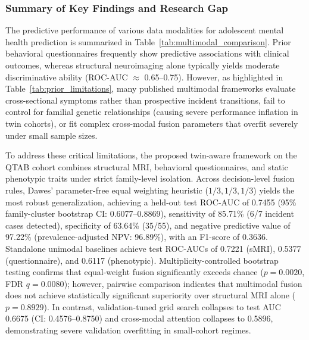\documentclass[10pt,letterpaper]{article}
\begin{document}
                \subsubsection*{Summary of Key Findings and Research Gap}

        The predictive performance of various data modalities for adolescent mental health prediction is summarized in Table~\ref{tab:multimodal_comparison}. Prior behavioral questionnaires frequently show predictive associations with clinical outcomes, whereas structural neuroimaging alone typically yields moderate discriminative ability (ROC-AUC $\approx$ 0.65--0.75). However, as highlighted in Table~\ref{tab:prior_limitations}, many published multimodal frameworks evaluate cross-sectional symptoms rather than prospective incident transitions, fail to control for familial genetic relationships (causing severe performance inflation in twin cohorts), or fit complex cross-modal fusion parameters that overfit severely under small sample sizes. 

        To address these critical limitations, the proposed twin-aware framework on the QTAB cohort combines structural MRI, behavioral questionnaires, and static phenotypic traits under strict family-level isolation. Across decision-level fusion rules, Dawes' parameter-free equal weighting heuristic ($1/3, 1/3, 1/3$) yields the most robust generalization, achieving a held-out test ROC-AUC of 0.7455 (95\% family-cluster bootstrap CI: 0.6077--0.8869), sensitivity of 85.71\% (6/7 incident cases detected), specificity of 63.64\% (35/55), and negative predictive value of 97.22\% (prevalence-adjusted NPV: 96.89\%), with an F1-score of 0.3636. Standalone unimodal baselines achieve test ROC-AUCs of 0.7221 (sMRI), 0.5377 (questionnaire), and 0.6117 (phenotypic). Multiplicity-controlled bootstrap testing confirms that equal-weight fusion significantly exceeds chance ($p = 0.0020$, FDR $q = 0.0080$); however, pairwise comparison indicates that multimodal fusion does not achieve statistically significant superiority over structural MRI alone ($p = 0.8929$). In contrast, validation-tuned grid search collapses to test AUC 0.6675 (CI: 0.4576--0.8750) and cross-modal attention collapses to 0.5896, demonstrating severe validation overfitting in small-cohort regimes.
\end{document}

